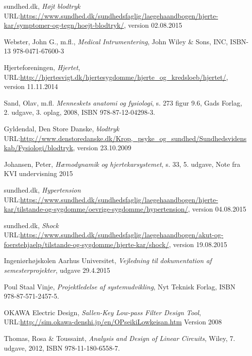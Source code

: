 \begin{thebibliography}{9}
	
	sundhed.dk,
	\emph{Højt blodtryk}
	URL:\url{https://www.sundhed.dk/sundhedsfaglig/laegehaandbogen/hjerte-kar/symptomer-og-tegn/hoejt-blodtryk/},
	version 02.08.2015
	
	Webster, John G., m.fl.,
	\emph{Medical Intrumentering},
	John Wiley \& Sons, INC, ISBN-13 978-0471-67600-3
	 
	 
	Hjerteforeningen,
	\emph{Hjertet},
	URL:\url{http://hjertesvigt.dk/hjertesygdomme/hjerte_og_kredsloeb/hjertet/},
	version 11.11.2014
	
	Sand, Olav, m.fl.
	\emph{Menneskets anatomi og fysiologi},
	s. 273 figur 9.6,
	Gads Forlag,
	2. udgave, 3. oplag,
	2008, ISBN 978-87-12-04298-3. 
	
	Gyldendal, Den Store Danske,
	\emph{blodtryk}
	URL:\url{http://www.denstoredanske.dk/Krop,_psyke_og_sundhed/Sundhedsvidenskab/Fysiologi/blodtryk},
	version 23.10.2009
	
	Johansen, Peter,
	\emph{Hæmodynamik og hjertekarsystemet},
	s. 33,
	5. udgave,
	Note fra KVI undervisning 2015
	
	sundhed.dk,
	\emph{Hypertension}
	URL:\url{https://www.sundhed.dk/sundhedsfaglig/laegehaandbogen/hjerte-kar/tilstande-og-sygdomme/oevrige-sygdomme/hypertension/},
	version 04.08.2015
	
	sundhed.dk,
	\emph{Shock}
	URL:\url{https://www.sundhed.dk/sundhedsfaglig/laegehaandbogen/akut-og-foerstehjaelp/tilstande-og-sygdomme/hjerte-kar/shock/},
	version 19.08.2015
	
	Ingeniørhøjskolen Aarhus Universitet,
	\emph{Vejledning til dokumentation af semesterprojekter},
	udgave 29.4.2015
	
	
	Poul Staal Vinje,
	\emph{Projektledelse af systemudvikling},
	Nyt Teknisk Forlag,
	ISBN 978-87-571-2457-5.
	
	OKAWA Electric Design,
	\emph{Sallen-Key Low-pass Filter Design Tool},
	URL:\url{http://sim.okawa-denshi.jp/en/OPseikiLowkeisan.htm}
	Version 2008
	
	
	Thomas, Rosa \& Toussaint,
	\emph{Analysis and Design of Linear Circuits},
	Wiley,
	7. udgave, 
	2012, ISBN  978-11-180-6558-7. 
	
	
\end{thebibliography}


